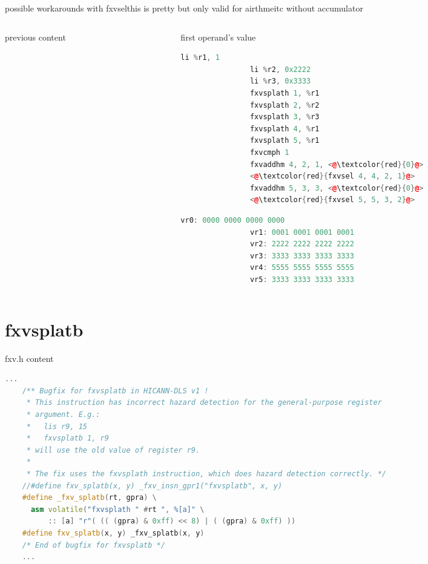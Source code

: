 \documentclass[10pt]{beamer}
\begin{document}
\begin{frame}[fragile]{possible workarounds with fxvsel}{this is pretty but only valid for airthmeitc without accumulator}
\begin{columns}[t]
\begin{column}{0.3\textwidth}
\begin{block}{previous content}
\begin{lstlisting}[language=C++,basicstyle=\fontsize{5}{7}\selectfont\ttfamily,keywordstyle=\color{red}]
				\end{lstlisting}
			\end{block}
    	\end{column}
    	\begin{column}{0.3\textwidth}
    		\begin{block}{first operand's value}
    		\begin{lstlisting}[language=C++,basicstyle=\ttfamily\scriptsize,keywordstyle=\color{red}]
				li %r1, 1
				li %r2, 0x2222
				li %r3, 0x3333
				fxvsplath 1, %r1
				fxvsplath 2, %r2
				fxvsplath 3, %r3
				fxvsplath 4, %r1
				fxvsplath 5, %r1
				fxvcmph 1
				fxvaddhm 4, 2, 1, <@\textcolor{red}{0}@>
				<@\textcolor{red}{fxvsel 4, 4, 2, 1}@>
				fxvaddhm 5, 3, 3, <@\textcolor{red}{0}@>
				<@\textcolor{red}{fxvsel 5, 5, 3, 2}@>
	\end{lstlisting}
      			\begin{lstlisting}[language=C++,basicstyle=\fontsize{5}{7}\selectfont\ttfamily,keywordstyle=\color{red}]
				vr0: 0000 0000 0000 0000
				vr1: 0001 0001 0001 0001
				vr2: 2222 2222 2222 2222
				vr3: 3333 3333 3333 3333
				vr4: 5555 5555 5555 5555
				vr5: 3333 3333 3333 3333
				\end{lstlisting}
			\end{block}
    	\end{column}
	\end{columns}
\end{frame}

\section{fxvsplatb}
\begin{frame}[fragile]{fxv.h content}{}
\begin{lstlisting}[language=C++,basicstyle=\fontsize{5}{7}\selectfont\ttfamily,keywordstyle=\color{red}]
	...
	/** Bugfix for fxvsplatb in HICANN-DLS v1 !
	 * This instruction has incorrect hazard detection for the general-purpose register
	 * argument. E.g.:
	 *   lis r9, 15
	 *   fxvsplatb 1, r9
	 * will use the old value of register r9.
	 *
	 * The fix uses the fxvsplath instruction, which does hazard detection correctly. */
	//#define fxv_splatb(x, y) _fxv_insn_gpr1("fxvsplatb", x, y)
	#define _fxv_splatb(rt, gpra) \
	  asm volatile("fxvsplath " #rt ", %[a]" \
	      :: [a] "r"( (( (gpra) & 0xff) << 8) | ( (gpra) & 0xff) ))
	#define fxv_splatb(x, y) _fxv_splatb(x, y)
	/* End of bugfix for fxvsplatb */
	...
\end{lstlisting}
\end{frame}
\end{document}
